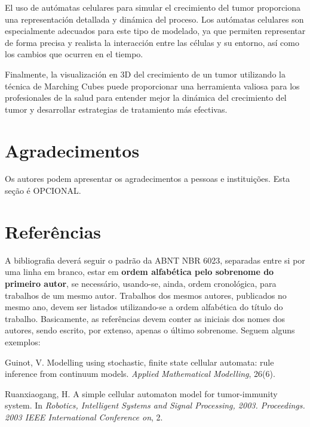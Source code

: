 \documentclass[a4paper,11pt]{article}
\begin{document}
{El uso de autómatas celulares para simular el crecimiento del tumor proporciona una representación detallada y dinámica del proceso. Los autómatas celulares son especialmente adecuados para este tipo de modelado, ya que permiten representar de forma precisa y realista la interacción entre las células y su entorno, así como los cambios que ocurren en el tiempo.

Finalmente, la visualización en 3D del crecimiento de un tumor utilizando la técnica de Marching Cubes puede proporcionar una herramienta valiosa para los profesionales de la salud para entender mejor la dinámica del crecimiento del tumor y desarrollar estrategias de tratamiento más efectivas.

\section*{Agradecimentos}

Os autores podem apresentar os agradecimentos a pessoas e instituições. Esta seção é OPCIONAL.




\section*{Referências}
{\color{red} A bibliografia deverá seguir o padrão da ABNT NBR 6023, separadas entre si por uma linha em branco, estar em \textbf{ordem alfabética pelo sobrenome do primeiro autor}, se necessário, usando-se, ainda, ordem cronológica, para trabalhos de um mesmo autor. Trabalhos dos mesmos autores, publicados no mesmo ano, devem ser listados utilizando-se a ordem alfabética do título do trabalho. Basicamente, as referências devem conter as iniciais dos nomes dos autores, sendo escrito, por extenso, apenas o último sobrenome. Seguem alguns exemplos:}


\begin{flushleft}

\begin{thebibliography}{99}
 Guinot, V. Modelling using stochastic, finite state cellular automata: rule inference from continuum models. \textit{Applied Mathematical Modelling}, 26(6).

\vskip 0.2cm
 Ruanxiaogang, H. A simple cellular automaton model for tumor-immunity system. In \textit{Robotics, Intelligent Systems and Signal Processing, 2003. Proceedings. 2003 IEEE International Conference on}, 2.


\end{thebibliography}
\end{flushleft}}
\end{document}
